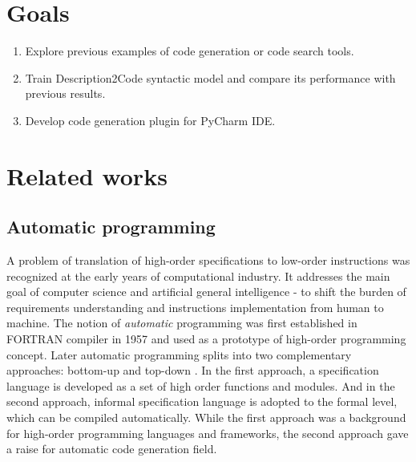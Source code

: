 

\section{Goals}

\begin{enumerate}
	\item Explore previous examples of code generation or code search tools.
	\item Train Description2Code syntactic model and compare its performance with previous results.
	\item Develop code generation plugin for PyCharm IDE.
\end{enumerate}


\section{Related works}
\subsection{Automatic programming}
A problem of translation of high-order specifications to low-order instructions was recognized at the early years of computational industry. It addresses the main goal of computer science and artificial general intelligence - to shift the burden of requirements understanding and instructions implementation from human to machine. The notion of \emph{automatic} programming was first established in FORTRAN compiler in 1957 \parencite{backus1957fortran} and used as a prototype of high-order programming concept.  Later automatic programming splits into two complementary approaches: bottom-up and top-down \parencite{Balzer1985}. In the first approach, a specification language is developed as a set of high order functions and modules. And in the second approach, informal specification language is adopted to the formal level, which can be compiled automatically. While the first approach was a background for high-order programming languages and frameworks, the second approach gave a raise for automatic code generation field. 

